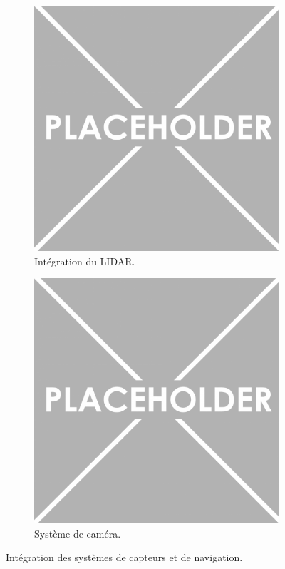 {\begin{figure}[!htpb]
    \centering
    \begin{subfigure}{0.45\textwidth}
        \centering
        \includegraphics[width=\textwidth]{Figures/PezizaTuberosa.jpg}
        \caption{Intégration du LIDAR.}
        \label{fig:lidar-integration}
    \end{subfigure}
    \hspace{.5cm}
    \begin{subfigure}{0.45\textwidth}
        \centering
        \includegraphics[width=\textwidth]{Figures/PezizaTuberosa.jpg}
        \caption{Système de caméra.}
        \label{fig:camera-system}
    \end{subfigure}
    \caption{Intégration des systèmes de capteurs et de navigation.}
    \label{fig:capteurs-navigation}
\end{figure}

}
